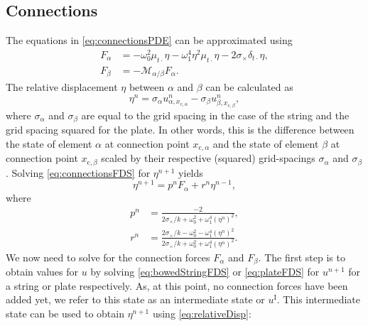 \documentclass{article}
\begin{document}
\subsection{Connections}
The equations in \eqref{eq:connectionsPDE} can be approximated using \cite{Bilbao2009:ModularPercussion}
\begin{subequations}
\begin{align}\label{eq:connectionsFDS}
    F_\alpha &= -\omega_0^2\mu_{t\cdot}\eta - \omega_1^4\eta^2\mu_{t\cdot}\eta - 2\sigma_\times\delta_{t\cdot}\eta,\\
    F_\beta &= -\mathcal{M}_{\alpha/\beta}F_\alpha.
\end{align}
\end{subequations}
The relative displacement $\eta$ between $\alpha$ and $\beta$ can be calculated as
\begin{equation}\label{eq:relativeDisp}
    \eta^n = \sigma_\alpha u_{\alpha, x_{\text{c},\alpha}}^n - \sigma_\beta u_{\beta,x_{\text{c},\beta}}^n,
\end{equation}
where $\sigma_\alpha$ and $\sigma_\beta$ are equal to the grid spacing in the case of the string and the grid spacing squared for the plate. In other words, this is the difference between the state of element $\alpha$ at connection point $x_{\text{c},\alpha}$ and the state of element $\beta$ at connection point $x_{\text{c},\beta}$ scaled by their respective (squared) grid-spacings $\sigma_\alpha$ and $\sigma_\beta$. Solving \eqref{eq:connectionsFDS} for $\eta^{n+1}$ yields
\begin{equation} \label{eq:etaNext}
    \eta^{n+1} = p^nF_\alpha+r^n\eta^{n-1},
\end{equation}
where
\begin{subequations}
\begin{align}
    p^n &= \frac{-2}{2\sigma_\times / k + \omega_0^2 + \omega_1^4(\eta^n)^2},\\
    r^n &= \frac{2\sigma_\times / k - \omega_0^2 -\omega_1^4(\eta^n)^2}{2\sigma_\times / k + \omega_0^2 + \omega_1^4(\eta^n)^2}.
\end{align}
\end{subequations}
We now need to solve for the connection forces $F_\alpha$ and $F_\beta$. The first step is to obtain values for $u$ by solving \eqref{eq:bowedStringFDS} or \eqref{eq:plateFDS} for $u^{n+1}$ for a string or plate respectively. As, at this point, no connection forces have been added yet, we refer to this state as an intermediate state or $u^\text{I}$. This intermediate state can be used to obtain $\eta^{n+1}$ using \eqref{eq:relativeDisp}:
\end{document}
